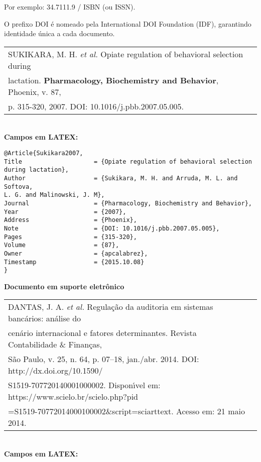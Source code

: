 Por exemplo: 34.7111.9 / ISBN (ou ISSN).

O prefixo DOI \'e nomeado pela International DOI Foundation (IDF),
garantindo identidade \'unica a cada documento. \\


\begin{tabular}{|l|c|} \hline
	SUKIKARA, M. H. \textit{et al.} Opiate regulation of behavioral selection during \\lactation. \textbf{Pharmacology, Biochemistry and Behavior}, Phoenix, v. 87,\\ p. 315-320, 2007. DOI: 10.1016/j.pbb.2007.05.005. 
	\\\hline
\end{tabular} \\

\textbf{Campos em LATEX:} 

\begin{verbatim}
@Article{Sukikara2007,
Title                    = {Opiate regulation of behavioral selection 
during lactation},
Author                   = {Sukikara, M. H. and Arruda, M. L. and 
Softova,
L. G. and Malinowski, J. M},
Journal                  = {Pharmacology, Biochemistry and Behavior},
Year                     = {2007},
Address                  = {Phoenix},
Note                     = {DOI: 10.1016/j.pbb.2007.05.005},
Pages                    = {315-320},
Volume                   = {87},
Owner                    = {apcalabrez},
Timestamp                = {2015.10.08}
}
\end{verbatim}

\textbf{Documento em suporte eletr\^onico} 

\begin{tabular}{|l|c|} \hline
	DANTAS, J. A. \textit{et al.} Regula\c{c}\~ao da auditoria em sistemas banc\'arios: an\'alise do \\ cen\'ario internacional e fatores determinantes. Revista Contabilidade \& Finan\c{c}as,\\ S\~ao Paulo, v. 25, n. 64, p. 07–18, jan./abr. 2014. DOI: http://dx.doi.org/10.1590/\\S1519-707720140001000002. Dispon\'{\i}vel em: https://www.scielo.br/scielo.php?pid\\=S1519-70772014000100002\&script=sciarttext. Acesso em: 21 maio 2014.	
	\\\hline
\end{tabular} \\

\textbf{Campos em LATEX:} 

